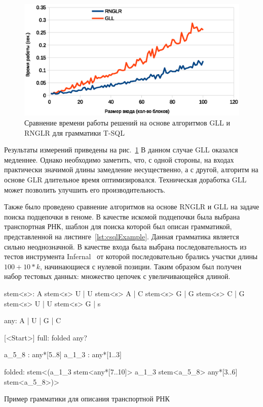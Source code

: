 \documentclass[14pt]{matmex-diploma}
\begin{document}
\begin{figure}
 \centering
 \includegraphics[width=15cm]{pics/SQL.eps}
 \caption{Сравнение времени работы решений на основе алгоритмов GLL и RNGLR для грамматики T-SQL}
 \label{exp3}
\end{figure}

Результаты измерений приведены на рис.~\ref{exp3} В данном случае GLL оказался медленнее. Однако необходимо заметить, что, с одной стороны, на входах практически значимой длины замедление несущественно, а с другой, алгоритм на основе GLR длительное время оптимизировался. Техническая доработка GLL может позволить улучшить его производительность.

Также было проведено сравнение алгоритмов на основе RNGLR и GLL на задаче поиска подцепочки в геноме. В качестве искомой подцепочки была выбрана транспортная РНК, шаблон для поиска которой был описан грамматикой, представленной на листинге~\ref{lst:csqlExample}. Данная грамматика является сильно неоднозначной. В качестве входа была выбрана последовательность из тестов инструмента Infernal~\cite{Infernal} от которой последовательно брались участки длины $100 + 10*k$, начинающиеся с нулевой позиции. Таким образом был получен набор тестовых данных: множество цепочек с увеличивающейся длиной.

\begin{listing}
    \begin{pyglist}[language=ocaml,numbers=left,numbersep=5pt]

stem<s>: 
      A stem<s> U
    | U stem<s> A
    | C stem<s> G
    | G stem<s> C
    | G stem<s> U
    | U stem<s> G
    | s

any: A | U | G | C

[<Start>]
full: folded any?

a_5_8 : any*[5..8]
a_1_3 : any*[1..3]

folded: stem<(a_1_3 stem<any*[7..10]> 
              a_1_3 stem<a_5_8> 
              any*[3..6] 
              stem<a_5_8>)> 

\end{pyglist}
\caption{Пример грамматики для описания транспортной РНК}
\label{lst:csqlExample}
\end{listing}
\end{document}
